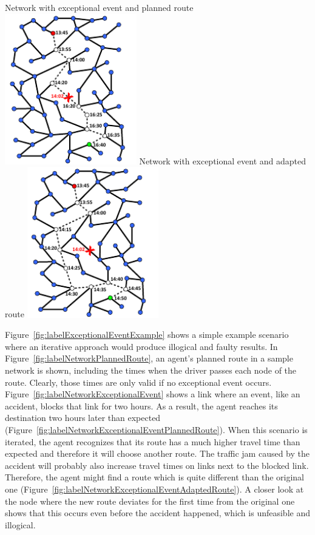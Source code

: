 {  \createsubfigure%
  {Network with exceptional event and planned route}%
  {\includegraphics[width=0.43\textwidth, angle=0]{extending/figures/WithinDayReplanning/network_original_route_with_event}}%
  {\label{fig:labelNetworkExceptionalEventPlannedRoute}}%
  {\qquad}%
  \createsubfigure%
  {Network with exceptional event and adapted route}%
  {\includegraphics[width=0.43\textwidth, angle=0]{extending/figures/WithinDayReplanning/network_adapted_route_with_event}}%
  {\label{fig:labelNetworkExceptionalEventAdaptedRoute}}%
  {}%
}%
{}

Figure~\ref{fig:labelExceptionalEventExample} shows a simple example scenario where an iterative approach would produce illogical and faulty results. In Figure~\ref{fig:labelNetworkPlannedRoute}, an agent's planned route in a sample network is shown, including the times when the driver passes each node of the route. Clearly, those times are only valid if no exceptional event occurs. Figure~\ref{fig:labelNetworkExceptionalEvent} shows a link where an event, like an accident, blocks that link for two hours. As a result, the agent reaches its destination two hours later than expected (Figure~\ref{fig:labelNetworkExceptionalEventPlannedRoute}). When this scenario is iterated, the agent recognizes that its route has a much higher travel time than expected and therefore it will choose another route. The traffic jam caused by the accident will probably also increase travel times on links next to the blocked link. Therefore, the agent might find a route which is quite different than the original one (Figure~\ref{fig:labelNetworkExceptionalEventAdaptedRoute}). A closer look at the node where the new route deviates for the first time from the original one shows that this occurs even before the accident happened, which is unfeasible and illogical.

